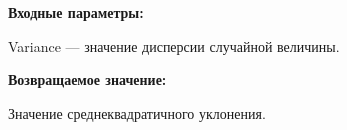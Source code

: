 \textbf{Входные параметры:}

 Variance --- значение дисперсии случайной величины.

\textbf{Возвращаемое значение:}

 Значение среднеквадратичного уклонения.
